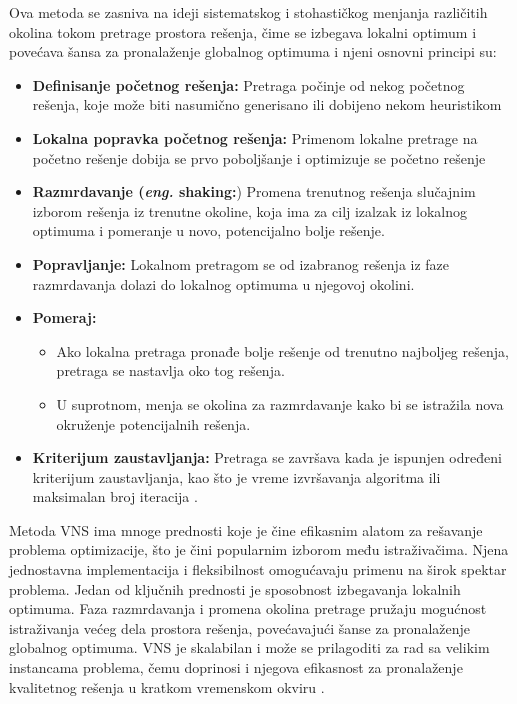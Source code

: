 \documentclass[12pt,oneside]{memoir}
\begin{document}
Ova metoda se zasniva na ideji sistematskog i stohastičkog menjanja različitih okolina tokom pretrage prostora rešenja, čime se izbegava lokalni optimum i povećava šansa za pronalaženje globalnog optimuma i njeni osnovni principi su:
\begin{itemize}
    \item \textbf{Definisanje početnog rešenja:} Pretraga počinje od nekog početnog rešenja, koje može biti nasumično generisano ili dobijeno nekom heuristikom
    \item \textbf{Lokalna popravka početnog rešenja:} Primenom lokalne pretrage na početno rešenje dobija se prvo poboljšanje i optimizuje se početno rešenje
    \item \textbf{Razmrdavanje (\textit{eng.} shaking:}) Promena trenutnog rešenja slučajnim izborom rešenja iz trenutne okoline, koja ima za cilj izalzak iz lokalnog optimuma i pomeranje u novo, potencijalno bolje rešenje.
    \item \textbf{Popravljanje:} Lokalnom pretragom se od izabranog rešenja iz faze razmrdavanja dolazi do lokalnog optimuma u njegovoj okolini.
    \item \textbf{Pomeraj:} 
    \begin{itemize}
        \item Ako lokalna pretraga pronađe bolje rešenje od trenutno najboljeg rešenja, pretraga se nastavlja oko tog rešenja.
        \item U suprotnom, menja se okolina za razmrdavanje kako bi se istražila nova okruženje potencijalnih rešenja.
    \end{itemize}
    \item \textbf{Kriterijum zaustavljanja:} Pretraga se završava kada je ispunjen određeni kriterijum zaustavljanja, kao što je vreme izvršavanja algoritma ili maksimalan broj iteracija \cite{mladenovic2009}.
\end{itemize}

Metoda VNS ima mnoge prednosti koje je čine efikasnim alatom za rešavanje problema optimizacije, što je čini popularnim izborom među istraživačima. Njena jednostavna implementacija i fleksibilnost omogućavaju primenu na širok spektar problema. Jedan od ključnih prednosti je sposobnost izbegavanja lokalnih optimuma. Faza razmrdavanja i promena okolina pretrage pružaju mogućnost istraživanja većeg dela prostora rešenja, povećavajući šanse za pronalaženje globalnog optimuma. VNS je skalabilan i može se prilagoditi za rad sa velikim instancama problema, čemu doprinosi i njegova efikasnost za pronalaženje kvalitetnog rešenja u kratkom vremenskom okviru \cite{mladenovic2010}.\\
\end{document}
